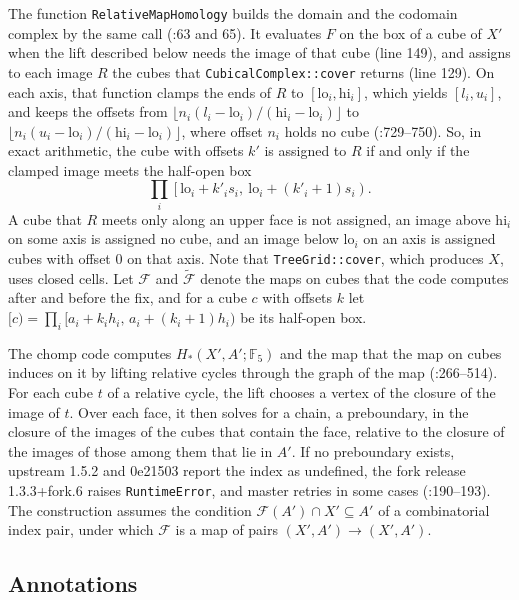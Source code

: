 \documentclass[11pt]{article}
\theoremstyle{plain}
\theoremstyle{definition}
\theoremstyle{remark}
\newcommand{\F}{\mathbb{F}_5}
\newcommand{\Fc}{\mathcal{F}}
\newcommand{\Ft}{\tilde{\mathcal{F}}}
\newcommand{\lo}{\mathrm{lo}}
\newcommand{\hi}{\mathrm{hi}}
\newcommand{\code}[1]{\texttt{#1}}
\begin{document}
The function \code{RelativeMapHomology} builds the domain and the codomain complex by the same call (:63 and 65). It evaluates $F$ on the box of a cube of $X'$ when the lift described below needs the image of that cube (line 149), and assigns to each image $R$ the cubes that \code{CubicalComplex::cover} returns (line 129). On each axis, that function clamps the ends of $R$ to $[\lo_i,\hi_i]$, which yields $[l_i,u_i]$, and keeps the offsets from $\lfloor n_i(l_i-\lo_i)/(\hi_i-\lo_i)\rfloor$ to $\lfloor n_i(u_i-\lo_i)/(\hi_i-\lo_i)\rfloor$, where offset $n_i$ holds no cube (:729--750). So, in exact arithmetic, the cube with offsets $k'$ is assigned to $R$ if and only if the clamped image meets the half-open box
\[
\prod_i\left[\lo_i+k'_is_i,\ \lo_i+(k'_i+1)s_i\right).
\]
A cube that $R$ meets only along an upper face is not assigned, an image above $\hi_i$ on some axis is assigned no cube, and an image below $\lo_i$ on an axis is assigned cubes with offset $0$ on that axis. Note that \code{TreeGrid::cover}, which produces $X$, uses closed cells. Let $\Fc$ and $\Ft$ denote the maps on cubes that the code computes after and before the fix, and for a cube $c$ with offsets $k$ let $[c)=\prod_i[a_i+k_ih_i,\,a_i+(k_i+1)h_i)$ be its half-open box.

The chomp code computes $H_*(X',A';\F)$ and the map that the map on cubes induces on it by lifting relative cycles through the graph of the map (:266--514). For each cube $t$ of a relative cycle, the lift chooses a vertex of the closure of the image of $t$. Over each face, it then solves for a chain, a preboundary, in the closure of the images of the cubes that contain the face, relative to the closure of the images of those among them that lie in $A'$. If no preboundary exists, upstream 1.5.2 and 0e21503 report the index as undefined, the fork release 1.3.3+fork.6 raises \code{RuntimeError}, and master retries in some cases (:190--193). The construction assumes the condition $\Fc(A')\cap X'\subseteq A'$ of a combinatorial index pair, under which $\Fc$ is a map of pairs $(X',A')\to(X',A')$.

\subsection{Annotations}\label{sec:annotations}
\end{document}
